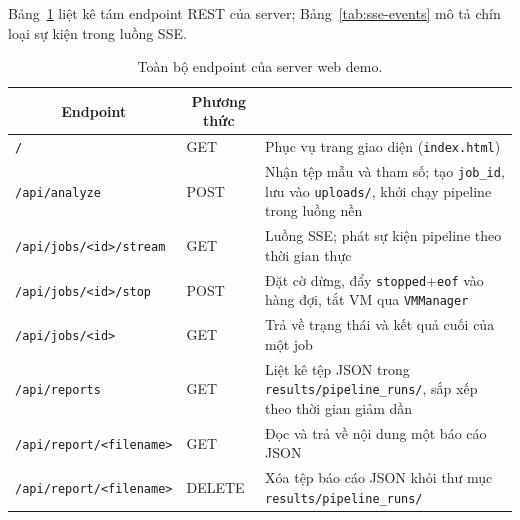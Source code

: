 \documentclass[../DoAn.tex]{subfiles}
\begin{document}
Bảng~\ref{tab:demo-endpoints} liệt kê tám endpoint REST của server;
Bảng~\ref{tab:sse-events} mô tả chín loại sự kiện trong luồng SSE.
\begin{table}[H]
\centering
\caption{Toàn bộ endpoint của server web demo.}
\label{tab:demo-endpoints}
\begin{tabular}{|l|l|>{\raggedright\arraybackslash}p{6.5cm}|}
\hline
\multicolumn{1}{|c|}{\textbf{Endpoint}} & \multicolumn{1}{c|}{\textbf{Phương thức}} & \multicolumn{1}{c|}{\textbf{Chức năng}} \\
\hline
\texttt{/}                          & GET  & Phục vụ trang giao diện (\texttt{index.html}) \\
\hline
\texttt{/api/analyze}               & POST & Nhận tệp mẫu và tham số; tạo \texttt{job\_id}, lưu vào \texttt{uploads/}, khởi chạy pipeline trong luồng nền \\
\hline
\texttt{/api/jobs/<id>/stream}      & GET  & Luồng SSE; phát sự kiện pipeline theo thời gian thực \\
\hline
\texttt{/api/jobs/<id>/stop}        & POST & Đặt cờ dừng, đẩy \texttt{stopped}+\texttt{eof} vào hàng đợi, tắt VM qua \texttt{VMManager} \\
\hline
\texttt{/api/jobs/<id>}             & GET  & Trả về trạng thái và kết quả cuối của một job \\
\hline
\texttt{/api/reports}               & GET  & Liệt kê tệp JSON trong \texttt{results/pipeline\_runs/}, sắp xếp theo thời gian giảm dần \\
\hline
\texttt{/api/report/<filename>}     & GET    & Đọc và trả về nội dung một báo cáo JSON \\
\hline
\texttt{/api/report/<filename>}     & DELETE & Xóa tệp báo cáo JSON khỏi thư mục \texttt{results/pipeline\_runs/} \\
\hline
\end{tabular}
\end{table}
\end{document}
